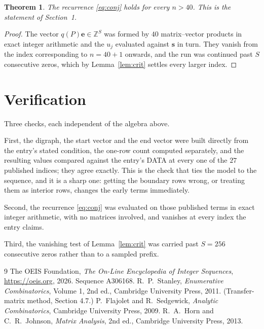 \documentclass[11pt,a4paper]{article}
\theoremstyle{plain}
\newtheorem{theorem}{Theorem}
\theoremstyle{definition}
\begin{document}
\begin{theorem}
The recurrence \eqref{eq:conj} holds for every $n>40$. This is the statement of
Section~1.
\end{theorem}

\begin{proof}
The vector $q(P)\mathbf{e}\in\mathbb{Z}^{S}$ was formed by $40$ matrix--vector
products in exact integer arithmetic and the $u_j$ evaluated against $\mathbf{s}$ in turn.
They vanish from the index corresponding to $n=40+1$ onwards, and the run was continued
past $S$ consecutive zeros, which by Lemma~\ref{lem:crit} settles every larger index.
\end{proof}

\section{Verification}

Three checks, each independent of the algebra above.

First, the digraph, the start vector and the end vector were built directly from the
entry's stated condition, the one-row count computed separately, and the resulting values
compared against the entry's DATA at every one of the $27$ published indices; they
agree exactly. This is the check that ties the model to the sequence, and it is a sharp one:
getting the boundary rows wrong, or treating them as interior rows, changes the early terms
immediately.

Second, the recurrence \eqref{eq:conj} was evaluated on those published terms in exact
integer arithmetic, with no matrices involved, and vanishes at every index the entry claims.

Third, the vanishing test of Lemma~\ref{lem:crit} was carried past $S=256$ consecutive
zeros rather than to a sampled prefix.

\begin{thebibliography}{9}
 The OEIS Foundation, \emph{The On-Line Encyclopedia of Integer
Sequences}, \url{https://oeis.org}, 2026. Sequence A306168.
 R.~P.~Stanley, \emph{Enumerative Combinatorics}, Volume 1, 2nd ed.,
Cambridge University Press, 2011. (Transfer-matrix method, Section 4.7.)
 P.~Flajolet and R.~Sedgewick, \emph{Analytic Combinatorics}, Cambridge
University Press, 2009.
 R.~A.~Horn and C.~R.~Johnson, \emph{Matrix Analysis}, 2nd ed., Cambridge
University Press, 2013.
\end{thebibliography}
\end{document}
